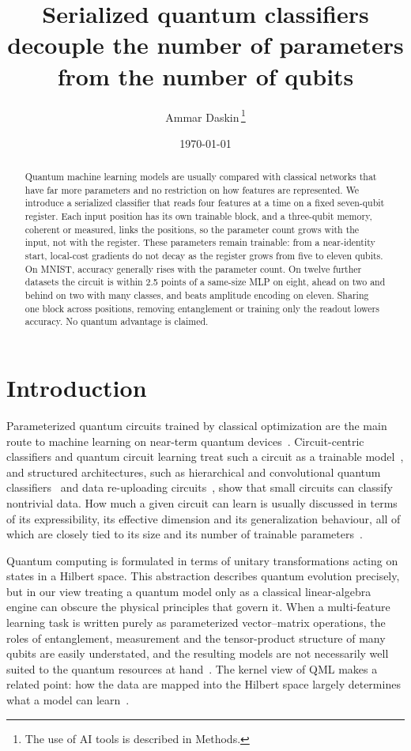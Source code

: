 \documentclass[11pt]{article}
\title{Serialized quantum classifiers decouple the number of parameters from the number of qubits}
\author{Ammar Daskin\,\orcidlink{0000-0002-1497-5031}\thanks{The use of AI tools is described in Methods.}}
\affil{Department of Computer Engineering, Istanbul Medeniyet University, Turkiye\\\textit{Corresponding author:} adaskin25@gmail.com}
\date{\today}
\begin{document}
\maketitle

\begin{abstract}
Quantum machine learning models are usually compared with classical networks that have far more parameters and no restriction on how features are represented. We introduce a serialized classifier that reads four features at a time on a fixed seven-qubit register. Each input position has its own trainable block, and a three-qubit memory, coherent or measured, links the positions, so the parameter count grows with the input, not with the register. These parameters remain trainable: from a near-identity start, local-cost gradients do not decay as the register grows from five to eleven qubits. On MNIST, accuracy generally rises with the parameter count. On twelve further datasets the circuit is within 2.5 points of a same-size MLP on eight, ahead on two and behind on two with many classes, and beats amplitude encoding on eleven. Sharing one block across positions, removing entanglement or training only the readout lowers accuracy. No quantum advantage is claimed.
\end{abstract}

\section{Introduction}
\label{sec:introduction}

Parameterized quantum circuits trained by classical optimization are the main route to machine learning on near-term quantum devices~\cite{preskill2018nisq,bharti2022nisq,cerezo2021vqa,benedetti2019pqc}. Circuit-centric classifiers and quantum circuit learning treat such a circuit as a trainable model~\cite{schuld2020circuitcentric,mitarai2018qcl}, and structured architectures, such as hierarchical and convolutional quantum classifiers~\cite{grant2018hierarchical,cong2019qcnn} and data re-uploading circuits~\cite{perezsalinas2020reuploading}, show that small circuits can classify nontrivial data. How much a given circuit can learn is usually discussed in terms of its expressibility, its effective dimension and its generalization behaviour, all of which are closely tied to its size and its number of trainable parameters~\cite{sim2019expressibility,abbas2021power,caro2022generalization}.

Quantum computing is formulated in terms of unitary transformations acting on states in a Hilbert space. This abstraction describes quantum evolution precisely, but in our view treating a quantum model only as a classical linear-algebra engine can obscure the physical principles that govern it. When a multi-feature learning task is written purely as parameterized vector--matrix operations, the roles of entanglement, measurement and the tensor-product structure of many qubits are easily understated, and the resulting models are not necessarily well suited to the quantum resources at hand~\cite{biamonte2017qml}. The kernel view of QML makes a related point: how the data are mapped into the Hilbert space largely determines what a model can learn~\cite{schuld2019qmlhilbert,schuld2021effect}.
\end{document}
